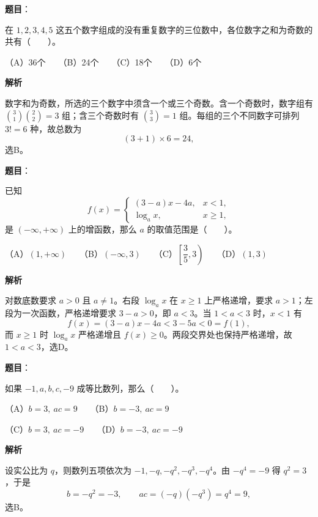 \begin{answer}

\textbf{题目}：

在 $1,2,3,4,5$ 这五个数字组成的没有重复数字的三位数中，各位数字之和为奇数的共有\mbox{（　　）}。

（A）36个　　（B）24个　　（C）18个　　（D）6个

\textbf{解析}

数字和为奇数，所选的三个数字中须含一个或三个奇数。含一个奇数时，数字组有 $\binom31\binom22=3$ 组；含三个奇数时有 $\binom33=1$ 组。每组的三个不同数字可排列 $3!=6$ 种，故总数为
\nopagebreak[4]
\[
(3+1)\times 6=24,
\]
选B。


\end{answer}
\begin{answer}

\textbf{题目}：

已知
\nopagebreak[4]
\[
f(x)=\begin{cases}
(3-a)x-4a, & x<1,\\
\log_a x, & x\ge 1,
\end{cases}
\]
是 $(-\infty,+\infty)$ 上的增函数，那么 $a$ 的取值范围是\mbox{（　　）}。

（A）$(1,+\infty)$　　（B）$(-\infty,3)$　　（C）$\left[\dfrac35,3\right)$　　（D）$(1,3)$

\textbf{解析}

对数底数要求 $a>0$ 且 $a\ne1$。右段 $\log_a x$ 在 $x\ge1$ 上严格递增，要求 $a>1$；左段为一次函数，严格递增要求 $3-a>0$，即 $a<3$。当 $1<a<3$ 时，$x<1$ 有
\nopagebreak[4]
\[
f(x)=(3-a)x-4a<3-5a<0=f(1),
\]
而 $x\ge1$ 时 $\log_a x$ 严格递增且 $f(x)\ge0$。两段交界处也保持严格递增，故 $1<a<3$，选D。


\end{answer}
\begin{answer}

\textbf{题目}：

如果 $-1,a,b,c,-9$ 成等比数列，那么\mbox{（　　）}。

（A）$b=3,\ ac=9$　　（B）$b=-3,\ ac=9$

（C）$b=3,\ ac=-9$　　（D）$b=-3,\ ac=-9$

\textbf{解析}

设实公比为 $q$，则数列五项依次为 $-1,-q,-q^2,-q^3,-q^4$。由 $-q^4=-9$ 得 $q^2=3$，于是
\nopagebreak[4]
\[
b=-q^2=-3,\qquad ac=(-q)(-q^3)=q^4=9,
\]
选B。


\end{answer}

